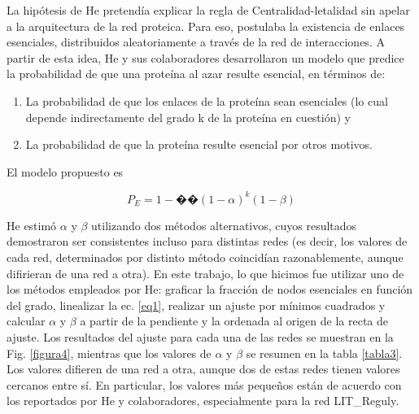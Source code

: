\documentclass[%
 reprint,
 amsmath,amssymb,
 aps,
]{revtex4-1}
\begin{document}
La hip\'otesis de He pretend\'ia explicar la regla de Centralidad-letalidad sin apelar a la arquitectura de la red proteica. Para eso, postulaba la existencia de enlaces esenciales, distribuidos aleatoriamente a trav\'es de la red de interacciones. A partir de esta idea, He y sus colaboradores desarrollaron un modelo que predice la probabilidad de que una prote\'ina al azar resulte esencial, en t\'erminos de:

\begin{enumerate}
\item La probabilidad de que los enlaces de la prote\'ina sean esenciales (lo cual depende indirectamente del grado k de la prote\'ina en cuesti\'on) y
\item La probabilidad de que la prote\'ina resulte esencial por otros motivos. 
\end{enumerate}

El modelo propuesto es

\begin{equation}
P_E = 1 -�� (1-\alpha)^k(1-\beta)
\label{eq1}
\end{equation}

He estim\'o $\alpha$ y $\beta$ utilizando dos m\'etodos alternativos, cuyos resultados demostraron ser consistentes incluso para distintas redes (es decir, los valores de cada red, determinados por distinto m\'etodo coincid\'ian razonablemente, aunque difirieran de una red a otra). En este trabajo, lo que hicimos fue utilizar uno de los m\'etodos empleados por He: graficar la fracci\'on de nodos esenciales en funci\'on del grado, linealizar la ec. \ref{eq1}, realizar un ajuste por m\'inimos cuadrados y calcular $\alpha$ y $\beta$ a partir de la pendiente y la ordenada al origen de la recta de ajuste. Los resultados del ajuste para cada una de las redes se muestran en la Fig. \ref{figura4}, mientras que los valores de $\alpha$ y $\beta$ se resumen en la tabla \ref{tabla3}. Los valores difieren de una red a otra, aunque dos de estas redes tienen valores cercanos entre s\'i. En particular, los valores m\'as peque\~nos est\'an de acuerdo con los reportados por He y colaboradores, especialmente para la red LIT\_Reguly. 
\end{document}
